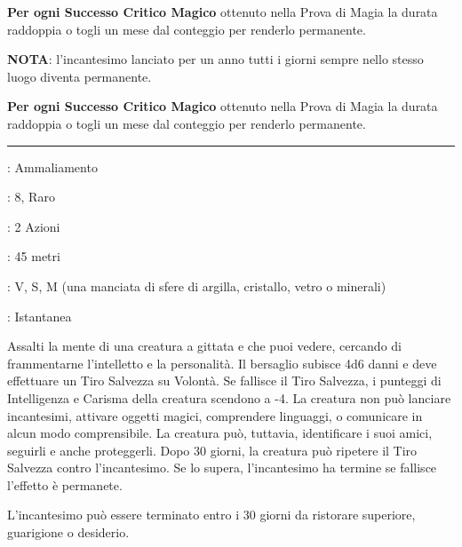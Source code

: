 \begin{multicols}{2}
\textbf{Per ogni Successo Critico Magico} ottenuto nella Prova di Magia la durata raddoppia o togli un mese dal conteggio per renderlo permanente.

\textbf{NOTA}: l'incantesimo lanciato per un anno tutti i giorni sempre nello stesso luogo diventa permanente.

\textbf{Per ogni Successo Critico Magico} ottenuto nella Prova di Magia la durata raddoppia o togli un mese dal conteggio per renderlo permanente.

\smallskip\noindent\rule{\linewidth}{2pt} \hypertarget{Regressione Mentale}{}\medskip{}
\noindent
\begin{description}[noitemsep, topsep=0pt, parsep=0pt, partopsep=0pt, leftmargin=0cm, labelwidth=2.8cm]
	\item[\textbf{Lista di Magia}]: Ammaliamento
	\item[\textbf{Livello}]: 8, Raro
	\item[\textbf{T. di Lancio}]: 2 Azioni
	\item[\textbf{Gittata}]: 45 metri
	\item[\textbf{Componenti}]: V, S, M (una manciata di sfere di argilla, cristallo, vetro o minerali)
	\item[\textbf{Durata}]: Istantanea
\end{description}

Assalti la mente di una creatura a gittata e che puoi vedere, cercando di frammentarne l'intelletto e la personalità. Il bersaglio subisce 4d6 danni e deve effettuare un Tiro Salvezza su Volontà. Se fallisce il Tiro Salvezza, i punteggi di Intelligenza e Carisma della creatura scendono a -4. La creatura non può lanciare incantesimi, attivare oggetti magici, comprendere linguaggi, o comunicare in alcun modo comprensibile. La creatura può, tuttavia, identificare i suoi amici, seguirli e anche proteggerli. Dopo 30 giorni, la creatura può ripetere il Tiro Salvezza contro l'incantesimo. Se lo supera, l'incantesimo ha termine se fallisce l'effetto è permanete.

L'incantesimo può essere terminato entro i 30 giorni da ristorare superiore, guarigione o desiderio.


\end{multicols}
